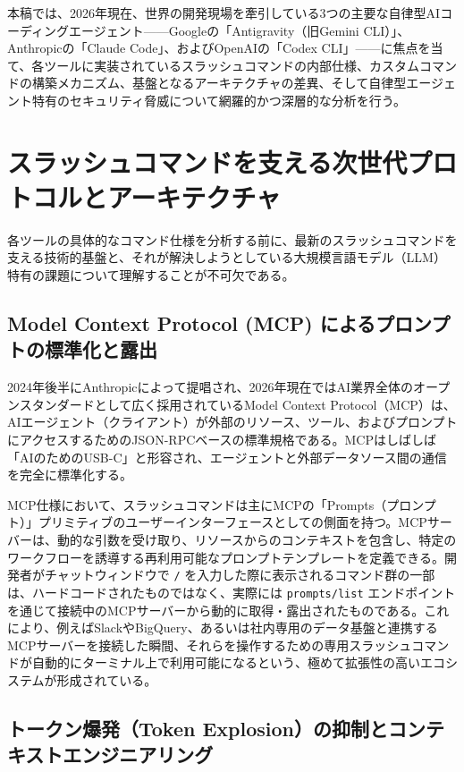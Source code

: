 \documentclass[a4paper,11pt]{ltjsarticle}
\newcommand{\cmd}[1]{\texttt{#1}}
\begin{document}
本稿では、2026年現在、世界の開発現場を牽引している3つの主要な自律型AIコーディングエージェント——Googleの「Antigravity（旧Gemini CLI）」、Anthropicの「Claude Code」、およびOpenAIの「Codex CLI」——に焦点を当て、各ツールに実装されているスラッシュコマンドの内部仕様、カスタムコマンドの構築メカニズム、基盤となるアーキテクチャの差異、そして自律型エージェント特有のセキュリティ脅威について網羅的かつ深層的な分析を行う。

\section{スラッシュコマンドを支える次世代プロトコルとアーキテクチャ}

各ツールの具体的なコマンド仕様を分析する前に、最新のスラッシュコマンドを支える技術的基盤と、それが解決しようとしている大規模言語モデル（LLM）特有の課題について理解することが不可欠である。

\subsection{Model Context Protocol (MCP) によるプロンプトの標準化と露出}

2024年後半にAnthropicによって提唱され、2026年現在ではAI業界全体のオープンスタンダードとして広く採用されているModel Context Protocol（MCP）は、AIエージェント（クライアント）が外部のリソース、ツール、およびプロンプトにアクセスするためのJSON-RPCベースの標準規格である\cite{r3}。MCPはしばしば「AIのためのUSB-C」と形容され、エージェントと外部データソース間の通信を完全に標準化する\cite{r11}。

MCP仕様において、スラッシュコマンドは主にMCPの「Prompts（プロンプト）」プリミティブのユーザーインターフェースとしての側面を持つ\cite{r4}。MCPサーバーは、動的な引数を受け取り、リソースからのコンテキストを包含し、特定のワークフローを誘導する再利用可能なプロンプトテンプレートを定義できる\cite{r4}。開発者がチャットウィンドウで \cmd{/} を入力した際に表示されるコマンド群の一部は、ハードコードされたものではなく、実際には \cmd{prompts/list} エンドポイントを通じて接続中のMCPサーバーから動的に取得・露出されたものである\cite{r3}。これにより、例えばSlackやBigQuery、あるいは社内専用のデータ基盤と連携するMCPサーバーを接続した瞬間、それらを操作するための専用スラッシュコマンドが自動的にターミナル上で利用可能になるという、極めて拡張性の高いエコシステムが形成されている\cite{r3}。

\subsection{トークン爆発（Token Explosion）の抑制とコンテキストエンジニアリング}
\end{document}
